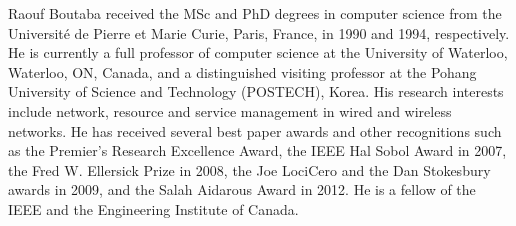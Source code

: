 \documentclass[journal]{IEEEtran}
\begin{document}
\begin{IEEEbiography}
{Raouf Boutaba}
received the MSc and PhD degrees in computer science from the Universit\'{e} de Pierre et Marie Curie, Paris, France, in 1990 and 1994, respectively. He is currently a full professor of computer science at the University of Waterloo, Waterloo, ON, Canada, and a distinguished visiting professor at the Pohang University of Science and Technology (POSTECH), Korea. His research interests include network, resource and service management in wired and wireless networks. He has received several best paper awards and other recognitions such as the Premier's Research Excellence Award, the IEEE Hal Sobol Award in 2007, the Fred W. Ellersick Prize in 2008, the Joe LociCero and the Dan Stokesbury awards in 2009, and the Salah Aidarous Award in 2012. He is a fellow of the IEEE and the Engineering Institute of Canada.
\end{IEEEbiography}
\end{document}
